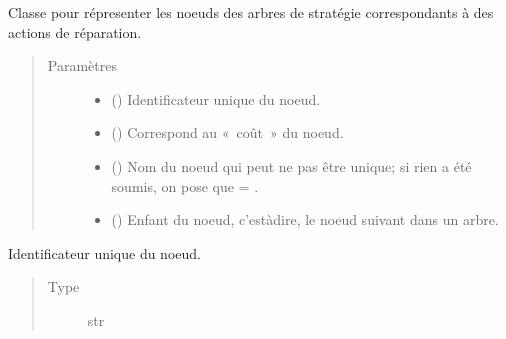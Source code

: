 \documentclass[letterpaper,10pt,french]{sphinxmanual}
\begin{document}

\begin{fulllineitems}
\label{\detokenize{index:StrategyTree.Repair}}
Classe pour répresenter les noeuds des arbres de stratégie correspondants à
des actions de réparation.
\begin{quote}\begin{description}
\item[{Paramètres}] \leavevmode\begin{itemize}
\item {} 
 () \textendash{} Identificateur unique du noeud.

\item {} 
 () \textendash{} Correspond au « coût » du noeud.

\item {} 
 (\sphinxstyleliteralemphasis{\sphinxupquote{, }}) \textendash{} Nom du noeud qui peut ne pas être unique; si rien a été soumis, on pose
que  = .

\item {} 
 ({\hyperref[\detokenize{index:StrategyTree.NodeST}]{}}\sphinxstyleliteralemphasis{\sphinxupquote{, }}) \textendash{} Enfant du noeud, c’est\sphinxhyphen{}à\sphinxhyphen{}dire, le noeud suivant dans un arbre.

\end{itemize}

\end{description}\end{quote}

\begin{fulllineitems}
\label{\detokenize{index:StrategyTree.Repair._id}}
Identificateur unique du noeud.
\begin{quote}\begin{description}
\item[{Type}] \leavevmode
str


\end{description}
\end{quote}
\end{fulllineitems}
\end{fulllineitems}
\end{document}
